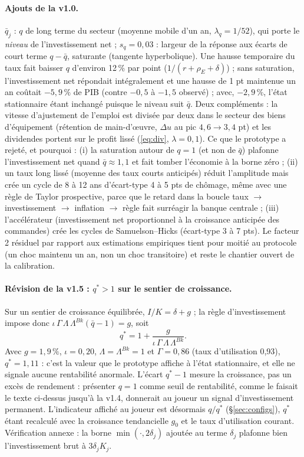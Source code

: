 \documentclass[11pt,a4paper]{article}
\begin{document}
\begin{lecture}
\paragraph{Ajouts de la v1.0.} $\bar q_j$ : $q$ de long terme du secteur (moyenne mobile d'un an, $\lambda_q=1/52$), qui porte le \emph{niveau} de l'investissement net ; $s_q=0{,}03$ : largeur de la réponse aux écarts de court terme $q-\bar q$, saturante (tangente hyperbolique). Une hausse temporaire du taux fait baisser $q$ d'environ 12\,\% par point ($1/(r+\rho_E+\delta)$) ; sans saturation, l'investissement net répondait intégralement et une hausse de 1 pt maintenue un an coûtait $-5{,}9\,\%$ de PIB (contre $-0{,}5$ à $-1{,}5$ observé) ; avec, $-2{,}9\,\%$, l'état stationnaire étant inchangé puisque le niveau suit $\bar q$. Deux compléments : la vitesse d'ajustement de l'emploi est divisée par deux dans le secteur des biens d'équipement (rétention de main-d'œuvre, $\Delta u$ au pic $4{,}6\to3{,}4$ pt) et les dividendes portent sur le profit lissé (\eqref{eq:div}, $\lambda=0{,}1$). Ce que le prototype a rejeté, et pourquoi : (i) la saturation autour de $q=1$ (et non de $\bar q$) plafonne l'investissement net quand $\bar q\approx1{,}1$ et fait tomber l'économie à la borne zéro ; (ii) un taux long lissé (moyenne des taux courts anticipés) réduit l'amplitude mais crée un cycle de 8 à 12 ans d'écart-type 4 à 5 pts de chômage, même avec une règle de Taylor prospective, parce que le retard dans la boucle taux $\to$ investissement $\to$ inflation $\to$ règle fait surréagir la banque centrale ; (iii) l'accélérateur (investissement net proportionnel à la croissance anticipée des commandes) crée les cycles de Samuelson--Hicks (écart-type 3 à 7 pts). Le facteur 2 résiduel par rapport aux estimations empiriques tient pour moitié au protocole (un choc maintenu un an, non un choc transitoire) et reste le chantier ouvert de la calibration.
\paragraph{Révision de la v1.5 : $q^\ast>1$ sur le sentier de croissance.} Sur un sentier de croissance équilibrée, $I/K=\delta+g$ ; la règle d'investissement impose donc $\iota\,\Gamma\,\Lambda\,\Lambda^{Bk}(\bar q-1)=g$, soit
\[
q^\ast = 1+\frac{g}{\iota\,\Gamma\,\Lambda\,\Lambda^{Bk}} .
\]
Avec $g=1{,}9\,\%$, $\iota=0{,}20$, $\Lambda=\Lambda^{Bk}=1$ et $\Gamma=0{,}86$ (taux d'utilisation 0,93), $q^\ast=1{,}11$ : c'est la valeur que le prototype affiche à l'état stationnaire, et elle ne signale aucune rentabilité anormale. L'écart $q^\ast-1$ mesure la croissance, pas un excès de rendement : présenter $q=1$ comme seuil de rentabilité, comme le faisait le texte ci-dessus jusqu'à la v1.4, donnerait au joueur un signal d'investissement permanent. L'indicateur affiché au joueur est désormais $q/q^\ast$ (\S\ref{sec:configs}), $q^\ast$ étant recalculé avec la croissance tendancielle $g_0$ et le taux d'utilisation courant. Vérification annexe : la borne $\min(\cdot,2\delta_j)$ ajoutée au terme $\delta_j$ plafonne bien l'investissement brut à $3\delta_jK_j$.

\end{lecture}
\end{document}
